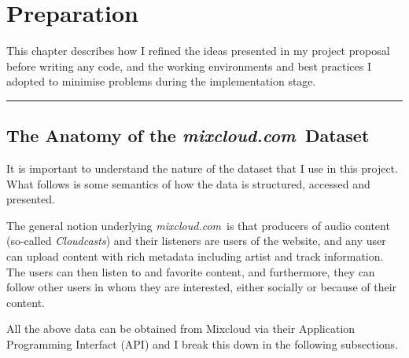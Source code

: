 \documentclass[a4paper,12pt,twoside,notitlepage]{report}
\def\mixurl{\emph{mixcloud.com}}
\newcommand{\rulewidth}{300pt}
\newcommand{\halfrule}{
  \begin{center}
    {\rule{\rulewidth}{0.5pt}}
  \end{center}}
\begin{document}
\chapter{Preparation}

This chapter describes how I refined the ideas presented in my project proposal
before writing any code, and the working environments and best practices I
adopted to minimise problems during the implementation stage.

\halfrule

\section{The Anatomy of the \mixurl\ Dataset}
\label{sec:mix-anatomy}

It is important to understand the nature of the dataset that I use in this
project. What follows is some semantics of how the data is structured, accessed
and presented. 

The general notion underlying \mixurl\ is that producers of audio
content (so-called \emph{Cloudcasts}) and their listeners are users of the
website, and any user can upload content with rich metadata including artist and
track information. The users can then listen to and favorite content, and
furthermore, they can follow other users in whom they are interested, either
socially or because of their content.

All the above data can be obtained from Mixcloud via their Application
Programming Interfact (API) and I break this down in the following subsections.
\end{document}
